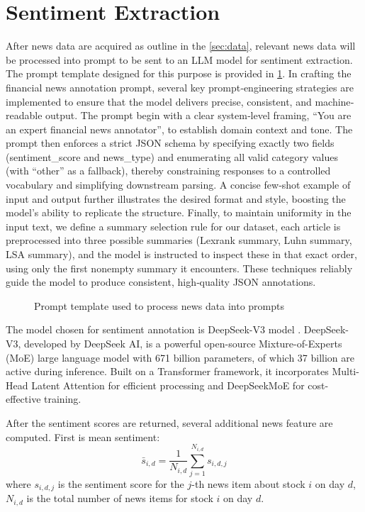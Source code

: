 \section{Sentiment Extraction}
After news data are acquired as outline in the \ref{sec:data}, relevant news data will be processed into prompt to be sent to an \gls{LLM} model for sentiment extraction. The prompt template designed for this purpose is provided in \ref{fig:prompt}. In crafting the financial news annotation prompt, several key prompt‐engineering strategies are implemented to ensure that the model delivers precise, consistent, and machine‐readable output. The prompt begin with a clear system‐level framing, “You are an expert financial news annotator”, to establish domain context and tone. The prompt then enforces a strict JSON schema by specifying exactly two fields (sentiment\_score and news\_type) and enumerating all valid category values (with “other” as a fallback), thereby constraining responses to a controlled vocabulary and simplifying downstream parsing. A concise few‐shot example of input and output further illustrates the desired format and style, boosting the model’s ability to replicate the structure. Finally, to maintain uniformity in the input text, we define a summary selection rule for our dataset, each article is preprocessed into three possible summaries (Lexrank summary, Luhn summary, \gls{LSA} summary), and the model is instructed to inspect these in that exact order, using only the first nonempty summary it encounters. These techniques reliably guide the model to produce consistent, high‐quality JSON annotations.

\begin{figure}
  \centering
  
  \caption{Prompt template used to process news data into prompts}
  \label{fig:prompt}
\end{figure}

The model chosen for sentiment annotation is DeepSeek-V3 model \cite{DeepSeekV3}. DeepSeek-V3, developed by DeepSeek AI, is a powerful open-source Mixture-of-Experts (MoE) large language model with 671 billion parameters, of which 37 billion are active during inference. Built on a Transformer framework, it incorporates Multi-Head Latent Attention for efficient processing and DeepSeekMoE for cost-effective training.

After the sentiment scores are returned, several additional news feature are computed. First is mean sentiment:
\[\bar{s}_{i,d}  = \frac{1}{N_{i,d}} \sum_{j=1}^{N_{i,d}} s_{i,d,j}\]
where \(s_{i,d,j}\) is the sentiment score for the \(j\)-th news item about stock \(i\) on day \(d\), \(N_{i,d}\) is the total number of news items for stock \(i\) on day \(d\).

